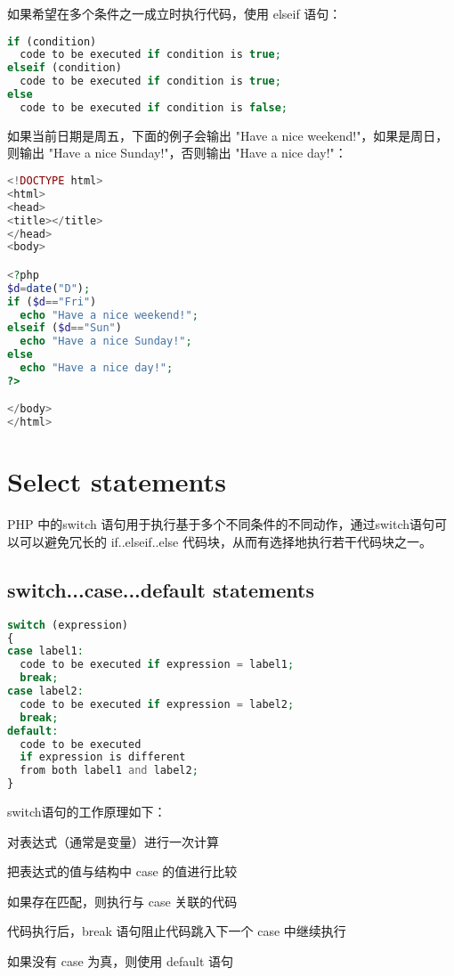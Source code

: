 如果希望在多个条件之一成立时执行代码，使用 elseif 语句：

\begin{lstlisting}[language=PHP]
if (condition)
  code to be executed if condition is true;
elseif (condition)
  code to be executed if condition is true;
else
  code to be executed if condition is false; 
\end{lstlisting}

如果当前日期是周五，下面的例子会输出 "Have a nice weekend!"，如果是周日，则输出 "Have a nice Sunday!"，否则输出 "Have a nice day!"：

\begin{lstlisting}[language=PHP]
<!DOCTYPE html>
<html>
<head>
<title></title>
</head>
<body>

<?php
$d=date("D");
if ($d=="Fri")
  echo "Have a nice weekend!"; 
elseif ($d=="Sun")
  echo "Have a nice Sunday!"; 
else
  echo "Have a nice day!"; 
?>

</body>
</html>
\end{lstlisting}



\section{Select statements}

PHP 中的switch 语句用于执行基于多个不同条件的不同动作，通过switch语句可以可以避免冗长的 if..elseif..else 代码块，从而有选择地执行若干代码块之一。


\subsection{switch...case...default statements}



\begin{lstlisting}[language=PHP]
switch (expression)
{
case label1:
  code to be executed if expression = label1;
  break;  
case label2:
  code to be executed if expression = label2;
  break;
default:
  code to be executed
  if expression is different 
  from both label1 and label2;
}
\end{lstlisting}

switch语句的工作原理如下：

\begin{compactenum}
\item 对表达式（通常是变量）进行一次计算
\item 把表达式的值与结构中 case 的值进行比较
\item 如果存在匹配，则执行与 case 关联的代码
\item 代码执行后，break 语句阻止代码跳入下一个 case 中继续执行
\item 如果没有 case 为真，则使用 default 语句
\end{compactenum}


